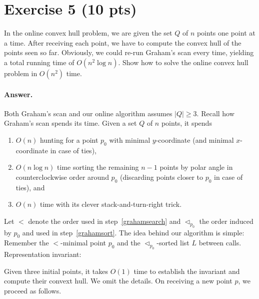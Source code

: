 \documentclass[a4paper]{article}
\begin{document}
\section*{Exercise 5 (10 pts)}

In the online convex hull problem, we are given the set $Q$ of $n$ points one point at a time. After receiving each point, we have to compute the convex hull of the points seen so far. Obviously, we could re-run Graham’s scan every time, yielding a total running time of $O(n^2 \log n)$. Show how to solve the online convex hull problem in $O(n^2)$ time.

\paragraph{Answer.}

Both Graham's scan and our online algorithm assumes $|Q| \ge 3$.
Recall how Graham's scan spends its time.
Given a set $Q$ of $n$ points, it spends
\begin{enumerate}

\item \label{grahamsearch} $O(n)$ hunting for a point $p_0$ with minimal $y$-coordinate (and minimal $x$-coordinate in case of ties),

\item \label{grahamsort} $O(n \log n)$ time sorting the remaining $n-1$ points by polar angle in counterclockwise order around $p_0$ (discarding points closer to $p_0$ in case of ties), and

\item \label{grahamCH} $O(n)$ time with its clever stack-and-turn-right trick.

\end{enumerate}
\newcommand{\below}{<}%
\newcommand*{\ccw}[1]{\lhd_{#1}}%
Let $\below$ denote the order used in step~\eqref{grahamsearch} and $\ccw{p_0}$ the order induced by $p_0$ and used in step~\eqref{grahamsort}.
The idea behind our algorithm is simple:
Remember the $\below$-minimal point $p_0$ and the $\ccw{p_0}$-sorted list $L$ between calls.
Representation invariant:
Given three initial points, it takes $O(1)$ time to establish the invariant and compute their convext hull.
We omit the details.
On receiving a new point $p$, we proceed as follows.
\end{document}
